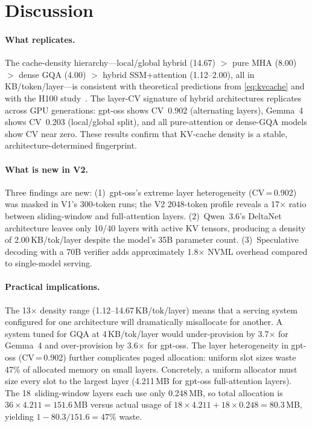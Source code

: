 \documentclass[11pt,a4paper]{article}
\begin{document}
\section{Discussion}
\label{sec:discussion}

\paragraph{What replicates.}
The cache-density hierarchy---local/global hybrid (14.67) $>$
pure MHA (8.00) $>$ dense GQA (4.00) $>$ hybrid SSM+attention
(1.12--2.00), all in KB/token/layer---is
consistent with theoretical predictions from \cref{eq:kvcache}
and with the H100 study~\cite{kvscope2026h100}.
The layer-CV signature of hybrid architectures replicates across
GPU generations: gpt-oss shows CV~0.902 (alternating layers),
Gemma~4 shows CV~0.203 (local/global split), and all
pure-attention or dense-GQA models show CV near zero.
These results confirm that KV-cache density is a stable,
architecture-determined fingerprint.

\paragraph{What is new in V2.}
Three findings are new:
(1)~gpt-oss's extreme layer heterogeneity (CV\,=\,0.902) was
masked in V1's 300-token runs; the V2 2048-token profile reveals
a 17$\times$ ratio between sliding-window and full-attention
layers.
(2)~Qwen~3.6's DeltaNet architecture leaves only 10/40 layers
with active KV tensors, producing a density of 2.00\,KB/tok/layer
despite the model's 35B parameter count.
(3)~Speculative decoding with a 70B verifier adds approximately
1.8$\times$ NVML overhead compared to single-model serving.

\paragraph{Practical implications.}
The 13$\times$ density range (1.12--14.67\,KB/tok/layer) means
that a serving system configured for one architecture will
dramatically misallocate for another.
A system tuned for GQA at 4\,KB/tok/layer would under-provision
by 3.7$\times$ for Gemma~4 and over-provision by 3.6$\times$
for gpt-oss.
The layer heterogeneity in gpt-oss (CV\,=\,0.902) further
complicates paged allocation: uniform slot sizes waste 47\% of
allocated memory on small layers.
Concretely, a uniform allocator must size every slot to the
largest layer (4.211\,MB for gpt-oss full-attention layers).
The 18~sliding-window layers each use only 0.248\,MB,
so total allocation is $36 \times 4.211 = 151.6$\,MB
versus actual usage of
$18 \times 4.211 + 18 \times 0.248 = 80.3$\,MB,
yielding $1 - 80.3/151.6 = 47\%$ waste.
\end{document}
